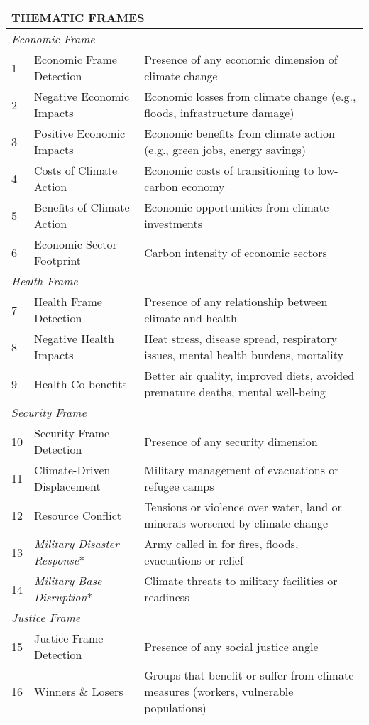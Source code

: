 \documentclass[12pt]{article}
\begin{document}
{\begin{longtable}{p{0.5cm}p{5cm}p{16cm}}
\multicolumn{3}{l}{\cellcolor{gray!10}\textbf{THEMATIC FRAMES}} \\
\midrule
\multicolumn{3}{l}{\textit{Economic Frame}} \\
1 & Economic Frame Detection & Presence of any economic dimension of climate change \\
2 & Negative Economic Impacts & Economic losses from climate change (e.g., floods, infrastructure damage) \\
3 & Positive Economic Impacts & Economic benefits from climate action (e.g., green jobs, energy savings) \\
4 & Costs of Climate Action & Economic costs of transitioning to low-carbon economy \\
5 & Benefits of Climate Action & Economic opportunities from climate investments \\
6 & Economic Sector Footprint & Carbon intensity of economic sectors \\
\midrule
\multicolumn{3}{l}{\textit{Health Frame}} \\
7 & Health Frame Detection & Presence of any relationship between climate and health \\
8 & Negative Health Impacts & Heat stress, disease spread, respiratory issues, mental health burdens, mortality \\
9 & Health Co-benefits & Better air quality, improved diets, avoided premature deaths, mental well-being \\
\midrule
\multicolumn{3}{l}{\textit{Security Frame}} \\
10 & Security Frame Detection & Presence of any security dimension \\
11 & Climate-Driven Displacement & Military management of evacuations or refugee camps \\
12 & Resource Conflict & Tensions or violence over water, land or minerals worsened by climate change \\
13 & \textit{Military Disaster Response}* & Army called in for fires, floods, evacuations or relief \\
14 & \textit{Military Base Disruption}* & Climate threats to military facilities or readiness \\
\midrule
\multicolumn{3}{l}{\textit{Justice Frame}} \\
15 & Justice Frame Detection & Presence of any social justice angle \\
16 & Winners \& Losers & Groups that benefit or suffer from climate measures (workers, vulnerable populations) \\

\end{longtable}}
\end{document}
